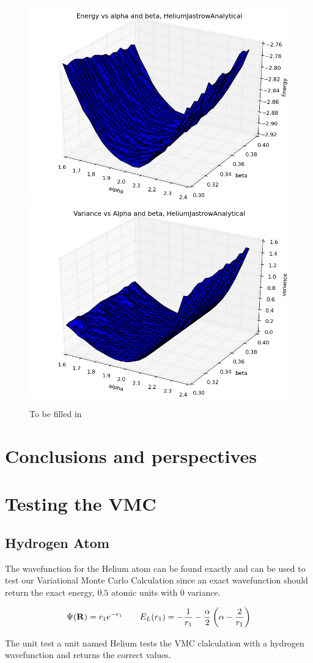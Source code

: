 \documentclass[11pt]{article}
\begin{document}
	\begin{figure}
		\centering
		\includegraphics[width=0.45\linewidth]{figures/HeliumJastrowAnalyticalAlphaBetaEnergy}
		\includegraphics[width=0.45\linewidth]{figures/HeliumJastrowAnalyticalAlphaBetaVariance}
		\caption{To be filled in}
		  \label{fig03:AlphaBeta}
	\end{figure}


\section{Conclusions and perspectives}

\appendix
	
	\section{Testing the VMC}
		\subsection{Hydrogen Atom}
			The wavefunction for the Helium atom can be found exactly and can be used to test our Variational Monte Carlo Calculation since an exact wavefunction should return the exact energy, \( 0.5 \) atomic units with \(0\) variance.

			\[ \Psi(\vb{R}) = r_1 e^{-r_1}  \qquad E_L(r_1) = -\frac{1}{r_1} - \frac{\alpha}{2} \left( \alpha - \frac{2}{r_1} \right) \]

			The unit test a unit named Helium tests the VMC clalculation with a hydrogen wavefunction and returns the correct values.
\end{document}
